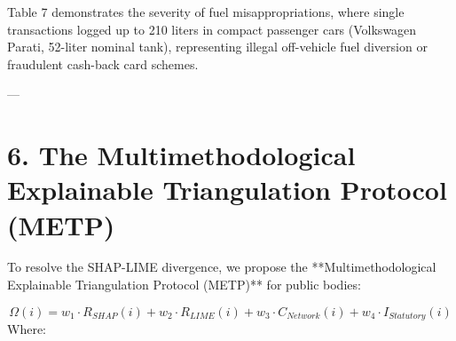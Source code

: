 \documentclass[10pt,a4paper,journal]{article}
\begin{document}
Table 7 demonstrates the severity of fuel misappropriations, where single transactions logged up to 210 liters in compact passenger cars (Volkswagen Parati, 52-liter nominal tank), representing illegal off-vehicle fuel diversion or fraudulent cash-back card schemes.

---

\section{6. The Multimethodological Explainable Triangulation Protocol (METP)}
To resolve the SHAP-LIME divergence, we propose the **Multimethodological Explainable Triangulation Protocol (METP)** for public bodies:

\begin{equation}
\Omega(i) = w_{1} \cdot R_{SHAP}(i) + w_{2} \cdot R_{LIME}(i) + w_{3} \cdot C_{Network}(i) + w_{4} \cdot I_{Statutory}(i) \label{eq:7}
\end{equation}
Where:
\end{document}
